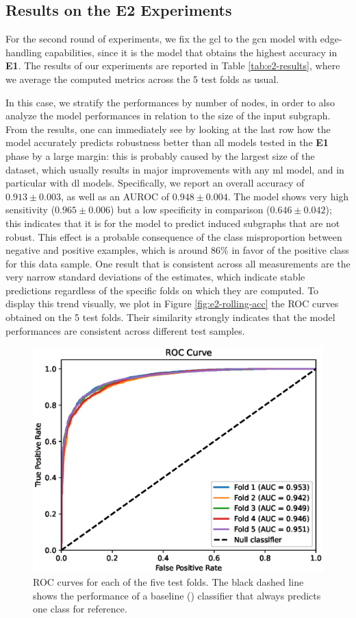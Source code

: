 \subsection{Results on the E2 Experiments}\label{sec:e2-results}
For the second round of experiments, we fix the \gls{gcl} to the \gls{gcn} model with edge-handling capabilities, since it is the model that obtains the highest accuracy in \textbf{E1}.
The results of our experiments are reported in Table \ref{tab:e2-results}, where we average the computed metrics across the 5 test folds as usual.

In this case, we stratify the performances by number of nodes, in order to also analyze the model performances in relation to the size of the input subgraph. From the results, one can immediately see by looking at the last row how the model accurately predicts robustness better than all models tested in the \textbf{E1} phase by a large margin: this is probably caused by the largest size of the dataset, which usually results in major improvements with any \gls{ml} model, and in particular with \gls{dl} models. Specifically, we report an overall accuracy of $0.913 \pm 0.003$, as well as an AUROC of $0.948 \pm 0.004$. The model shows very high sensitivity ($0.965 \pm 0.006$) but a low specificity in comparison ($0.646 \pm 0.042$); this indicates that it is  for the model to predict induced subgraphs that are not robust. This effect is a probable consequence of the class misproportion between negative and positive examples, which is around 86\% in favor of the positive class for this data sample. One result that is consistent across all measurements are the very narrow standard deviations of the estimates, which indicate stable predictions regardless of the specific folds on which they are computed. To display this trend visually, we plot in Figure \ref{fig:e2-rolling-acc} the ROC curves obtained on the 5 test folds. Their similarity strongly indicates that the model performances are consistent across different test samples.
\begin{figure}
    \centering
    \includegraphics[width=.65\textwidth]{Figures/Chapter5/e2-roc-curve.eps}
    \caption{ROC curves for each of the five test folds. The black dashed line shows the performance of a baseline () classifier that always predicts one class for reference.}\label{fig:e2-roc-curve}
\end{figure}
